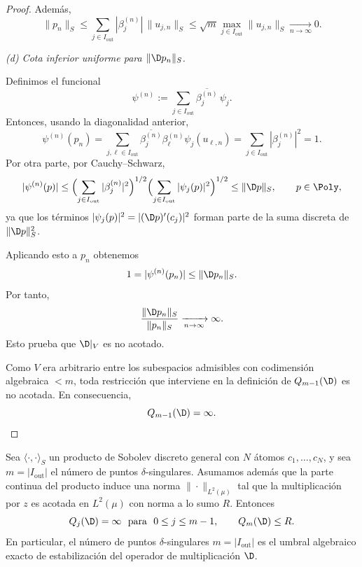 \begin{proof}
	Además,
	\[
		\|p_n\|_S
		\le
		\sum_{j\in I_{\mathrm{out}}} |\beta_j^{(n)}|\,\|u_{j,n}\|_S
		\le
		\sqrt m \max_{j\in I_{\mathrm{out}}}\|u_{j,n}\|_S
		\xrightarrow[n\to\infty]{}0.
	\]

	\smallskip
	\noindent
	\emph{(d) Cota inferior uniforme para $\|\D p_n\|_S$.}

	Definimos el funcional
	\[
		\psi^{(n)}:=\sum_{j\in I_{\mathrm{out}}}\overline{\beta_j^{(n)}}\,\psi_j.
	\]
	Entonces, usando la diagonalidad anterior,
	\[
		\psi^{(n)}(p_n)
		=
		\sum_{j,\ell\in I_{\mathrm{out}}}
		\overline{\beta_j^{(n)}}\beta_\ell^{(n)}\psi_j(u_{\ell,n})
		=
		\sum_{j\in I_{\mathrm{out}}}|\beta_j^{(n)}|^2
		=1.
	\]
	Por otra parte, por Cauchy--Schwarz,
	\[
		|\psi^{(n)}(p)|
		\le
		\Bigl(\sum_{j\in I_{\mathrm{out}}}|\beta_j^{(n)}|^2\Bigr)^{1/2}
		\Bigl(\sum_{j\in I_{\mathrm{out}}}|\psi_j(p)|^2\Bigr)^{1/2}
		\le
		\|\D p\|_S,
		\qquad p\in\Poly,
	\]
	ya que los términos $|\psi_j(p)|^2=|(\D p)'(c_j)|^2$ forman parte de la suma discreta
	de $\|\D p\|_S^2$.

	Aplicando esto a $p_n$ obtenemos
	\[
		1=|\psi^{(n)}(p_n)|\le \|\D p_n\|_S.
	\]
	Por tanto,
	\[
		\frac{\|\D p_n\|_S}{\|p_n\|_S}\xrightarrow[n\to\infty]{}\infty.
	\]
	Esto prueba que $\D|_V$ es no acotado.

	Como $V$ era arbitrario entre los subespacios admisibles con codimensión algebraica
	$<m$, toda restricción que interviene en la definición de $Q_{m-1}(\D)$ es no
	acotada. En consecuencia,
	\[
		Q_{m-1}(\D)=\infty.
	\]
\end{proof}

\begin{thm}
	\label{thm:umbral_exacto_Qm_nobpe}
	\label{thm:umbral_delta_singular}
	Sea $\langle\cdot,\cdot\rangle_S$ un producto de Sobolev discreto general
	con $N$ átomos $c_1,\dots,c_N$, y sea
	$m=|I_{\mathrm{out}}|$ el número de puntos $\delta$-singulares. Asumamos
	además que la parte continua del producto induce una norma
	$\|\cdot\|_{L^2(\mu)}$ tal que la multiplicación por $z$ es acotada en
	$L^2(\mu)$ con norma a lo sumo $R$. Entonces
	\[
		Q_j(\D)=\infty\ \text{ para }\ 0\le j\le m-1,
		\qquad
		Q_m(\D)\le R.
	\]
	En particular, el número de puntos $\delta$-singulares $m = |I_{\mathrm{out}}|$ es el umbral algebraico exacto de estabilización del operador de multiplicación $\D$.
\end{thm}

